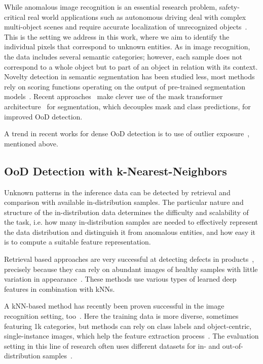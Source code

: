 \documentclass[10pt,twocolumn,letterpaper]{article}
\begin{document}
While anomalous image recognition is an essential research problem, safety-critical real world applications such as autonomous driving deal with complex multi-object scenes and require accurate localization of unrecognized objects~\cite{a_benchmark, blum2019fishyscapes, segmentmeifyoucan2021}. This is the setting we address in this work, where we aim to identify the individual pixels that correspond to unknown entities.
As in image recognition, the data includes several semantic categories; however, each sample does not correspond to a whole object but to part of an object in relation with its context. 
Novelty detection in semantic segmentation has been studied less, most methods rely on scoring functions operating on the output of pre-trained segmentation models~\cite{a_benchmark, Jung_2021_ICCV, moose, cen2021deep, liang2022gmmseg}. Recent approaches~\cite{Grcic_2023_CVPR, RbA} make clever use of the mask transformer architecture~\cite{mask2former} for segmentation, which decouples mask and class predictions, for improved OoD detection. 

A trend in recent works for dense OoD detection is to use of outlier exposure~\cite{Chan2021EntropyMA, Tian2021, Grcic2022}, mentioned above.


\subsection{OoD Detection with k-Nearest-Neighbors}
Unknown patterns in the inference data can be detected by retrieval and comparison with available in-distribution samples. The particular nature and structure of the in-distribution data determines the difficulty and scalability of the task, i.e. how many in-distribution samples are needed to effectively represent the data distribution and distinguish it from anomalous entities, and how easy it is to compute a suitable feature representation.

Retrieval based approaches are very successful at detecting defects in products~\cite{SPADE, reiss2021panda, patchcore, Zou2022}, precisely because they can rely on abundant images of healthy samples with little variation in appearance~\cite{mvtec}. These methods use various types of learned deep features in combination with kNNs.

A kNN-based method has recently been proven successful in the image recognition setting, too~\cite{sun2022knnood}. Here the training data is more diverse, sometimes featuring 1k categories, but methods can rely on class labels and object-centric, single-instance images, which help the feature extraction process~\cite{demystifying_contrastive}. The evaluation setting in this line of research often uses different datasets for in- and out-of-distribution samples~\cite{huang2021mos,sun2022knnood}.
\end{document}
